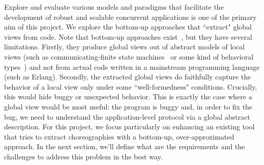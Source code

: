 Explore and evaluate various models and paradigms that facilitate  
the development of robust and scalable concurrent applications is  
one of the primary aim of this project. We explore the bottom-up  
approaches that ``extract" global views from code. Note that  
bottom-up approaches exist~\cite{myh09,lt12,lty15,cflm17,cms18},  
but they have several limitations.  
%  
Firstly, they produce global views out of abstract models of local  
views (such as communicating-finite state machines~\cite{bz83} or  
some kind of behavioral types~\cite{Huttel+16}) and not from actual  
code written in a mainstream programming language (such as Erlang).  
Secondly, the extracted global views do faithfully capture the  
behavior of a local view only under some ``well-formedness"  
conditions. Crucially, this would hide buggy or unexpected behavior.  
%  
This is exactly the case where a global view would be most useful:  
the program is buggy and, in order to fix the bug, we need to  
understand the application-level protocol via a global abstract  
description.  
%  
For this project, we focus particularly on enhancing an existing  
tool that tries to extract choreographies with a bottom-up,  
over-approximated approach. In the next section, we'll define what  
are the requirements and the challenges to address this problem in  
the best way.